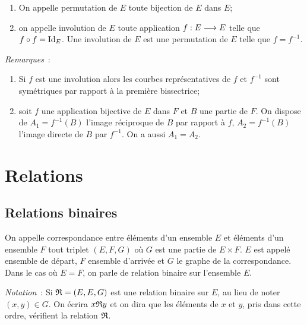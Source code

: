 \begin{defdef}
    \begin{enumerate}
        \item On appelle permutation de \(E\) toute bijection de \(E\) dans \(E\);
        \item on appelle involution de \(E\) toute application 
            \(f:E \longrightarrow E\) telle que \(f \circ f=\operatorname{Id}_E\). Une 
            involution de \(E\) est une permutation de \(E\) telle que 
            \(f=f^{-1}\).
    \end{enumerate}
\end{defdef}

\emph{Remarques}~:
\begin{enumerate}
    \item Si \(f\) est une involution alors les courbes représentatives de \(f\) 
        et \(f^{-1}\) sont symétriques par rapport à la première bissectrice;
    \item soit \(f\) une application bijective de \(E\) dans \(F\) et \(B\) une 
        partie de \(F\). On dispose de \(A_1=f^{-1}(B)\) l'image réciproque de 
        \(B\) par rapport à \(f\), \(A_2=f^{-1}(B)\) l'image directe de \(B\) 
        par \(f^{-1}\). On a aussi \(A_1=A_2\).
\end{enumerate}

\section{Relations}
\label{chap3-sec:relations}

\subsection{Relations binaires}
\label{chap3-subsec:relationbinaire}

\begin{defdef}
    On appelle correspondance entre éléments d'un ensemble \(E\) et éléments 
    d'un ensemble \(F\) tout triplet \((E,F,G)\) où \(G\) est une partie de \(E 
    \times F\). \(E\) est appelé ensemble de départ, \(F\) ensemble d'arrivée et 
    \(G\) le graphe de la correspondance. Dans le cas où \(E=F\), on parle de 
    relation binaire sur l'ensemble \(E\).
\end{defdef}
\emph{Notation}~: Si \(\mathfrak{R}=(E,E,G)\) est une relation binaire sur \(E\), au 
lieu de noter \((x,y) \in G\). On écrira \(x\mathfrak{R}{}y\) et on dira que les 
éléments de \(x\) et \(y\), pris dans cette ordre, vérifient la relation 
\(\mathfrak{R}\).

